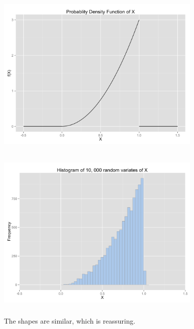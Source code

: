 \documentclass[12pt]{article}
\begin{document}
 \begin{center}
\includegraphics[width=10cm, height=8cm]{density}
\end{center}
 
 \begin{center}
\includegraphics[width=10cm, height=8cm]{histogram}
\end{center}

The shapes are similar, which is reassuring.
\end{document}
